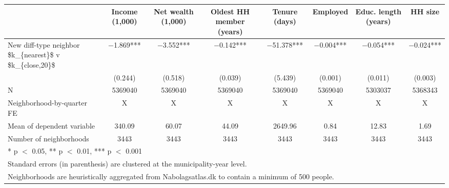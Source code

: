 \begin{tabular}[t]{lccccccc}
\toprule
  & Income (1,000) & Net wealth (1,000) & Oldest HH member (years) & Tenure (days) & Employed & Educ. length (years) & HH size\\
\midrule
New diff-type neighbor \$k\_\{nearest\}\$ v \$k\_\{close,20\}\$ & \num{-1.869}*** & \num{-3.552}*** & \num{-0.142}*** & \num{-51.378}*** & \num{-0.004}*** & \num{-0.054}*** & \num{-0.024}***\\
 & (\num{0.244}) & (\num{0.518}) & (\num{0.039}) & (\num{5.439}) & (\num{0.001}) & (\num{0.011}) & (\num{0.003})\\
\midrule
N & 5369040 & 5369040 & 5369040 & 5369040 & 5369040 & 5303037 & 5368343\\
Neighborhood-by-quarter FE & X & X & X & X & X & X & X\\
Mean of dependent variable & 340.09 & 60.07 & 44.09 & 2649.96 & 0.84 & 12.83 & 1.69\\
Number of neighborhoods & 3443 & 3443 & 3443 & 3443 & 3443 & 3443 & 3443\\
\bottomrule
\multicolumn{8}{l}{\rule{0pt}{1em}* p $<$ 0.05, ** p $<$ 0.01, *** p $<$ 0.001}\\
\multicolumn{8}{l}{\rule{0pt}{1em}Standard errors (in parenthesis) are clustered at the municipality-year level.}\\
\multicolumn{8}{l}{\rule{0pt}{1em}Neighborhoods are heuristically aggregated from Nabolagsatlas.dk to contain a minimum of 500 people.}\\
\end{tabular}